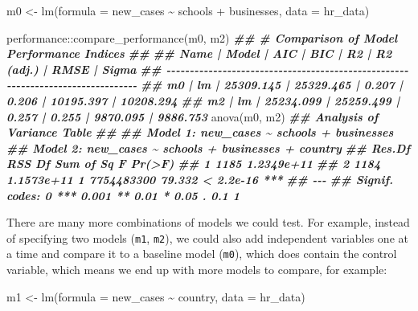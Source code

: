 \documentclass[
]{book}
\newenvironment{Shaded}{\begin{snugshade}}{\end{snugshade}}
\newcommand{\AttributeTok}[1]{\textcolor[rgb]{0.77,0.63,0.00}{#1}}
\newcommand{\DocumentationTok}[1]{\textcolor[rgb]{0.56,0.35,0.01}{\textbf{\textit{#1}}}}
\newcommand{\FunctionTok}[1]{\textcolor[rgb]{0.00,0.00,0.00}{#1}}
\newcommand{\NormalTok}[1]{#1}
\newcommand{\OtherTok}[1]{\textcolor[rgb]{0.56,0.35,0.01}{#1}}
\newcommand{\SpecialCharTok}[1]{\textcolor[rgb]{0.00,0.00,0.00}{#1}}
\begin{document}
\begin{Shaded}
\begin{Highlighting}[]
\NormalTok{m0 }\OtherTok{\textless{}{-}} \FunctionTok{lm}\NormalTok{(}\AttributeTok{formula =}\NormalTok{ new\_cases }\SpecialCharTok{\textasciitilde{}}
\NormalTok{           schools }\SpecialCharTok{+}
\NormalTok{           businesses,}
         \AttributeTok{data =}\NormalTok{ hr\_data)}

\NormalTok{performance}\SpecialCharTok{::}\FunctionTok{compare\_performance}\NormalTok{(m0, m2)}
\DocumentationTok{\#\# \# Comparison of Model Performance Indices}
\DocumentationTok{\#\# }
\DocumentationTok{\#\# Name | Model |       AIC |       BIC |    R2 | R2 (adj.) |      RMSE |     Sigma}
\DocumentationTok{\#\# {-}{-}{-}{-}{-}{-}{-}{-}{-}{-}{-}{-}{-}{-}{-}{-}{-}{-}{-}{-}{-}{-}{-}{-}{-}{-}{-}{-}{-}{-}{-}{-}{-}{-}{-}{-}{-}{-}{-}{-}{-}{-}{-}{-}{-}{-}{-}{-}{-}{-}{-}{-}{-}{-}{-}{-}{-}{-}{-}{-}{-}{-}{-}{-}{-}{-}{-}{-}{-}{-}{-}{-}{-}{-}{-}{-}{-}{-}{-}{-}}
\DocumentationTok{\#\# m0   |    lm | 25309.145 | 25329.465 | 0.207 |     0.206 | 10195.397 | 10208.294}
\DocumentationTok{\#\# m2   |    lm | 25234.099 | 25259.499 | 0.257 |     0.255 |  9870.095 |  9886.753}
\FunctionTok{anova}\NormalTok{(m0, m2)}
\DocumentationTok{\#\# Analysis of Variance Table}
\DocumentationTok{\#\# }
\DocumentationTok{\#\# Model 1: new\_cases \textasciitilde{} schools + businesses}
\DocumentationTok{\#\# Model 2: new\_cases \textasciitilde{} schools + businesses + country}
\DocumentationTok{\#\#   Res.Df        RSS Df  Sum of Sq      F    Pr(\textgreater{}F)    }
\DocumentationTok{\#\# 1   1185 1.2349e+11                                   }
\DocumentationTok{\#\# 2   1184 1.1573e+11  1 7754483300 79.332 \textless{} 2.2e{-}16 ***}
\DocumentationTok{\#\# {-}{-}{-}}
\DocumentationTok{\#\# Signif. codes:  0 \textquotesingle{}***\textquotesingle{} 0.001 \textquotesingle{}**\textquotesingle{} 0.01 \textquotesingle{}*\textquotesingle{} 0.05 \textquotesingle{}.\textquotesingle{} 0.1 \textquotesingle{} \textquotesingle{} 1}
\end{Highlighting}
\end{Shaded}

There are many more combinations of models we could test. For example, instead of specifying two models (\texttt{m1}, \texttt{m2}), we could also add independent variables one at a time and compare it to a baseline model (\texttt{m0}), which does contain the control variable, which means we end up with more models to compare, for example:

\leavevmode\hypertarget{four-hierarchical-regressions-nested}{}%
m1 \textless- lm(formula = new\_cases \textasciitilde{} country, data = hr\_data)
\end{document}
